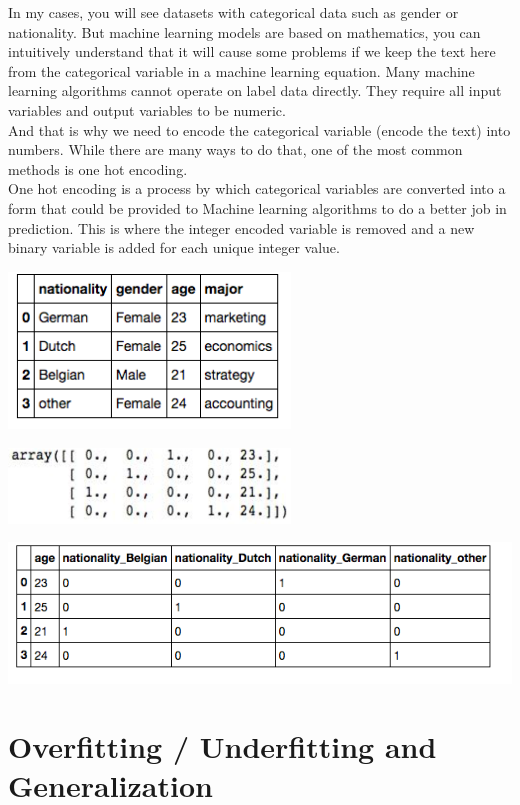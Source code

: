 \documentclass{42-en}
\begin{document}
In my cases, you will see datasets with categorical data such as gender or nationality. But machine learning models are based on mathematics, you can intuitively understand that it will cause some problems if we keep the text here from the categorical variable in a machine learning equation. Many machine learning algorithms cannot operate on label data directly. They require all input variables and output variables to be numeric.\\

And that is why we need to encode the categorical variable (encode the text) into numbers. While there are many ways to do that, one of the most common methods is one hot encoding.\\

One hot encoding is a process by which categorical variables are converted into a form that could be provided to Machine learning algorithms to do a better job in prediction. This is where the integer encoded variable is removed and a new binary variable is added for each unique integer value.\\

\centerline{\includegraphics[width=75mm]{images/nationality_words.png}}
\centerline{\includegraphics[width=75mm]{images/array_data.png}}
\centerline{\includegraphics[width=150mm]{images/nationality_nums.png}}

\section*{Overfitting / Underfitting and Generalization}
\end{document}
